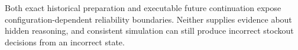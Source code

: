 Both exact historical preparation and executable future continuation expose configuration-dependent reliability boundaries. Neither supplies evidence about hidden reasoning, and consistent simulation can still produce incorrect stockout decisions from an incorrect state.
